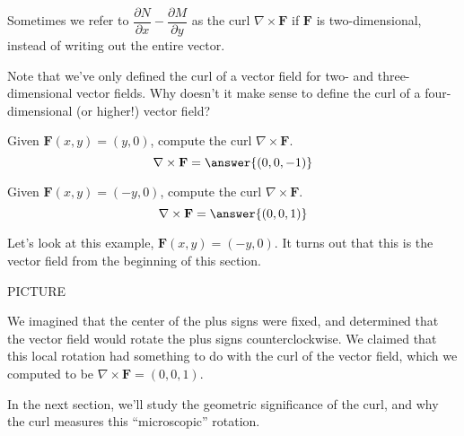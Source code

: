 \documentclass{ximera}
\begin{document}
Sometimes we refer to $\dfrac{\partial N}{\partial x} - \dfrac{\partial M}{\partial y}$ as the curl $\nabla\times\mathbf{F}$ if $\mathbf{F}$ is two-dimensional, instead of writing out the entire vector.

Note that we've only defined the curl of a vector field for two- and three-dimensional vector fields. Why doesn't it make sense to define the curl of a four-dimensional (or higher!) vector field?
\begin{multipleChoice}
\end{multipleChoice}

\begin{problem}
Given $\mathbf{F}(x,y)=(y,0)$, compute the curl $\nabla\times\mathbf{F}$.
\[
\nabla\times\mathbf{F} = \answer{(0,0,-1)}
\]
\end{problem}

\begin{problem}
Given $\mathbf{F}(x,y)=(-y,0)$, compute the curl $\nabla\times\mathbf{F}$.
\[
\nabla\times\mathbf{F} = \answer{(0,0,1)}
\]
\end{problem}

Let's look at this example, $\mathbf{F}(x,y) = (-y,0)$. It turns out that this is the vector field from the beginning of this section.

PICTURE

We imagined that the center of the plus signs were fixed, and determined that the vector field would rotate the plus signs counterclockwise. We claimed that this local rotation had something to do with the curl of the vector field, which we computed to be $\nabla\times\mathbf{F} = (0,0,1)$.

In the next section, we'll study the geometric significance of the curl, and why the curl measures this ``microscopic'' rotation.
\end{document}

